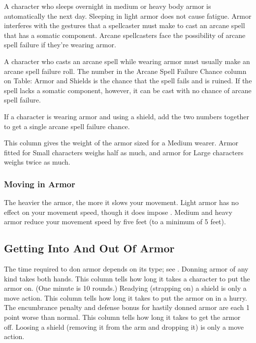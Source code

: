  A character who sleeps overnight in medium or heavy body armor is automatically \fatigued the next day. Sleeping in light armor does not cause fatigue.
 Armor interferes with the gestures that a spellcaster must make to cast an arcane spell that has a somatic component. Arcane spellcasters face the possibility of arcane spell failure if they're wearing armor.

 A character who casts an arcane spell while wearing armor must usually make an arcane spell failure roll. The number in the Arcane Spell Failure Chance column on Table: Armor and Shields is the chance that the spell fails and is ruined. If the spell lacks a somatic component, however, it can be cast with no chance of arcane spell failure.

 If a character is wearing armor and using a shield, add the two numbers together to get a single arcane spell failure chance.

 This column gives the weight of the armor sized for a Medium wearer. Armor fitted for Small characters weighs half as much, and armor for Large characters weighs twice as much.

\subsubsection{Moving in Armor}
    The heavier the armor, the more it slows your movement. Light armor has no effect on your movement speed, though it does impose . Medium and heavy armor reduce your movement speed by five feet (to a minimum of 5 feet).

\subsection{Getting Into And Out Of Armor}
The time required to don armor depends on its type; see . Donning armor of any kind takes both hands.
 This column tells how long it takes a character to put the armor on. (One minute is 10 rounds.) Readying (strapping on) a shield is only a move action.
 This column tells how long it takes to put the armor on in a hurry. The encumbrance penalty and defense bonus for hastily donned armor are each 1 point worse than normal.
 This column tells how long it takes to get the armor off. Loosing a shield (removing it from the arm and dropping it) is only a move action.

